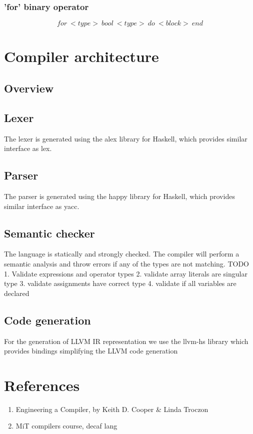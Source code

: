 \documentclass{article}
\begin{document}
\subsubsection{'for' binary operator}
$$
for \ <type> \ bool \ <type> \ do \ <block> \ end
$$

\section{Compiler architecture}
\subsection{Overview}

\subsection{Lexer}
The lexer is generated using the alex library for Haskell, which provides similar interface as lex. 

\subsection{Parser}
The parser is generated using the happy library for Haskell, which provides similar interface as yacc. 


\subsection{Semantic checker}
The language is statically and strongly checked. The compiler will perform a semantic analysis and throw errors if any of the types are not matching. 
TODO
1. Validate expressions and operator types
2. validate array literals are singular type
3. validate assignments have correct type
4. validate if all variables are declared



\subsection{Code generation}
For the generation of LLVM IR representation we use the llvm-hs library which provides bindings simplifying the LLVM code generation





\section{References}
\begin{enumerate}
    \item  Engineering a Compiler, by Keith D. Cooper & Linda Troczon
    \item MiT compilers course, decaf lang
\end{enumerate}
\end{document}
